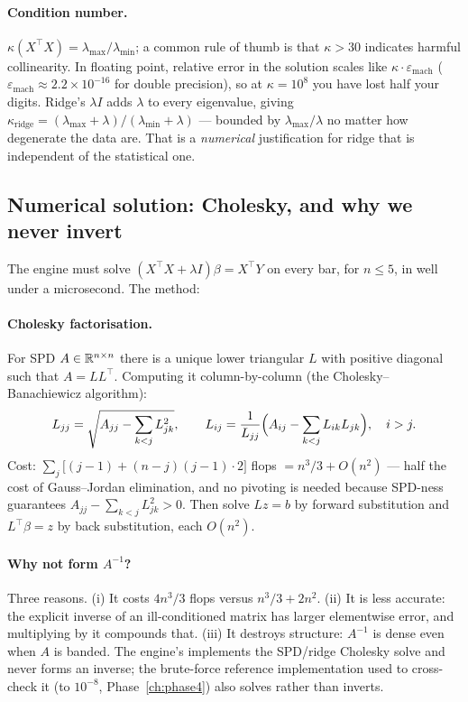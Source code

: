 \paragraph{Condition number.} $\kappa(X^{\top}X)=\lambda_{\max}/\lambda_{\min}$; a common
rule of thumb is that $\kappa>30$ indicates harmful collinearity. In floating point,
relative error in the solution scales like $\kappa\cdot\varepsilon_{\text{mach}}$
($\varepsilon_{\text{mach}}\approx2.2\times10^{-16}$ for double precision), so at
$\kappa=10^{8}$ you have lost half your digits. Ridge's $\lambda I$ adds $\lambda$ to
every eigenvalue, giving $\kappa_{\text{ridge}}=(\lambda_{\max}+\lambda)/(\lambda_{\min}+\lambda)$
--- bounded by $\lambda_{\max}/\lambda$ no matter how degenerate the data are. That is a
\emph{numerical} justification for ridge that is independent of the statistical one.

\subsection{Numerical solution: Cholesky, and why we never invert}
\label{sec:ols:cholesky}

The engine must solve $(X^{\top}X+\lambda I)\beta = X^{\top}Y$ on every bar, for $n\le5$,
in well under a microsecond. The method:

\paragraph{Cholesky factorisation.} For SPD $A\in\mathbb{R}^{n\times n}$ there is a unique lower
triangular $L$ with positive diagonal such that $A=LL^{\top}$. Computing it
column-by-column (the Cholesky--Banachiewicz algorithm):
\begin{equation}
  L_{jj} = \sqrt{A_{jj}-\sum_{k<j}L_{jk}^2},
  \qquad
  L_{ij} = \frac{1}{L_{jj}}\Bigl(A_{ij}-\sum_{k<j}L_{ik}L_{jk}\Bigr),\quad i>j .
  \label{eq:cholesky}
\end{equation}
Cost: $\sum_{j}\bigl[(j-1) + (n-j)(j-1)\cdot 2\bigr]$ flops $= n^3/3 + O(n^2)$ --- half
the cost of Gauss--Jordan elimination, and no pivoting is needed because SPD-ness
guarantees $A_{jj}-\sum_{k<j}L_{jk}^2>0$. Then solve $Lz=b$ by forward substitution and
$L^{\top}\beta=z$ by back substitution, each $O(n^2)$.

\paragraph{Why not form $A^{-1}$?} Three reasons. (i) It costs $4n^3/3$ flops versus
$n^3/3+2n^2$. (ii) It is less accurate: the explicit inverse of an ill-conditioned
matrix has larger elementwise error, and multiplying by it compounds that. (iii) It
destroys structure: $A^{-1}$ is dense even when $A$ is banded. The engine's
 implements the SPD/ridge Cholesky solve and never forms an
inverse; the brute-force reference implementation used to cross-check it (to $10^{-8}$,
Phase~\ref{ch:phase4}) also solves rather than inverts.

